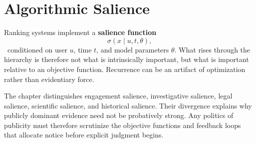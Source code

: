 
\chapter{Algorithmic Salience}
\label{ch:ch027}

Ranking systems implement a \textbf{salience function}
\[
\sigma(x\mid u,t,\theta),
\]
\Definition\ conditioned on user \(u\), time \(t\), and model parameters \(\theta\). What rises through the hierarchy is therefore not what is intrinsically important, but what is important relative to an objective function. Recurrence can be an artifact of optimization rather than evidentiary force.

The chapter distinguishes engagement salience, investigative salience, legal salience, scientific salience, and historical salience. Their divergence explains why publicly dominant evidence need not be probatively strong. Any politics of publicity must therefore scrutinize the objective functions and feedback loops that allocate notice before explicit judgment begins.
